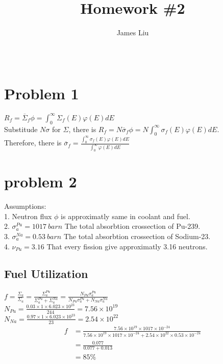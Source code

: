 \documentclass{article}
\title{\textbf{Homework \#2 }}
\author{James Liu}
\date{\ }
\begin{document}
\maketitle
\section*{Problem 1}

\(R_f = \overline{\Sigma}_f\phi =\displaystyle{{\int^\infty_0 \Sigma_f(E)\varphi(E)dE}}\)\\
Substitude \(N\sigma \) for \(\Sigma\), there is \(R_f = N\overline{\sigma}_f \phi=N\displaystyle{{\int^\infty_0 \sigma_f(E)\varphi(E)dE}}\).\\
Therefore, there is \(\overline{\sigma}_f=\displaystyle{\frac{\int^\infty_0 \sigma_f(E)\varphi(E)dE}{\int^\infty_0\varphi(E)dE}}\)
\section*{problem 2}
Assumptions:\\
1. Neutron flux \(\phi\) is approximatly same in coolant and fuel.\\
2. \(\sigma_{a}^{Pu} = 1017 \ barn\) The total absorbtion crossection of Pu-239.\\
3. \(\sigma_a^{Na} = 0.53 \ barn \) The total absorbtion crossection of Sodium-23.\\
4. \(\nu_{Pu}=3.16\) That every fission give approximatly 3.16 neutrons.
\subsection*{Fuel Utilization}
\(\displaystyle f=\frac{\Sigma_{a}}{\Sigma_a}=
\frac{\Sigma_{a}^{Pu}}{\Sigma_a^{Pu}+\Sigma_a^{Na}}=
\frac{N_{Pu}\sigma_{a}^{Pu}}{N_{Pu}\sigma_a^{Pu}+N_{Na}\sigma_a^{Na}} \)\\
\(\displaystyle N_{Pu}=\frac{0.03\times 1\times 6.023\times 10^{23}}{244}=7.56\times 10^{19}\)\\
\(\displaystyle N_{Na}=\frac{0.97\times 1\times 6.023\times 10^{23}}{23}=2.54\times 10^{22}\)\\
\begin{align*}
    f&=\frac{7.56\times 10^{19}\times 1017\times 10^{-24}}{7.56\times 10^{19}\times 1017\times 10^{-24}+2.54\times 10^{22}\times 0.53\times 10^{-24}}
    \\&=\frac{0.077}{0.077+0.013}\\&=85\%
\end{align*}
\end{document}
